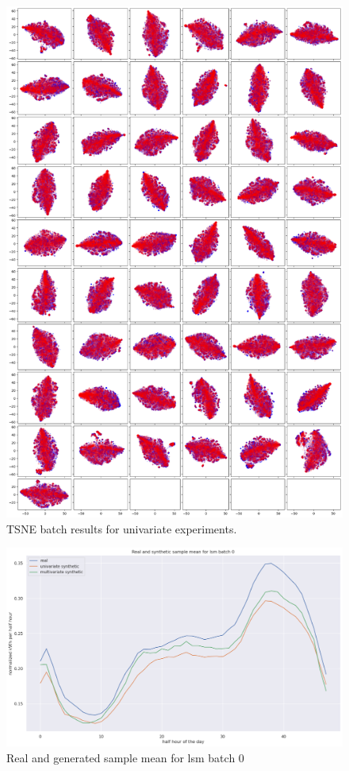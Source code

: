 \begin{figure}
    \centering
    \includegraphics[height=\textheight]{images/tsen_overall_uni.png}
    \caption{TSNE batch results for univariate experiments.}
    \label{fig:tsne overall uni}
\end{figure}
\begin{figure}
    \centering
    \includegraphics[width=\textwidth]{images/lsm_dm_0.png}
    \caption{Real and generated sample mean for lsm batch 0}
    \label{fig:sample mean 09}
\end{figure}
